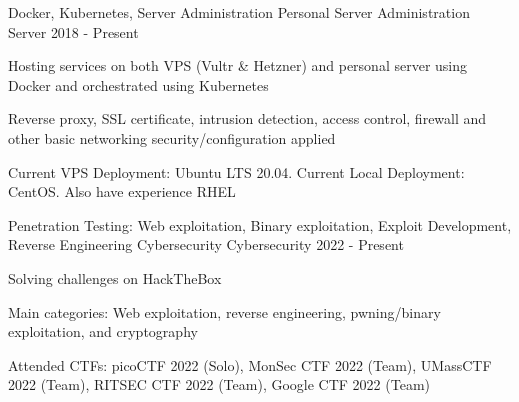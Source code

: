 

\begin{cventries}

  \cventry
    {Docker, Kubernetes, Server Administration}
    {Personal Server Administration}
    {Server}
    {2018 - Present}
    {
      \begin{cvitems}
        \item{Hosting services on both VPS (Vultr \& Hetzner) and personal server using Docker and orchestrated using Kubernetes}
        \item{Reverse proxy, SSL certificate, intrusion detection, access control, firewall and other basic networking security/configuration applied}
        \item{Current VPS Deployment: Ubuntu LTS 20.04. Current Local Deployment: CentOS. Also have experience RHEL}
      \end{cvitems}
    }



  \cventry
    {Penetration Testing: Web exploitation, Binary exploitation, Exploit Development, Reverse Engineering}
    {Cybersecurity}
    {Cybersecurity}
    {2022 - Present}
    {
      \begin{cvitems}
        \item{Solving challenges on HackTheBox}
        \item{Main categories: Web exploitation, reverse engineering, pwning/binary exploitation, and cryptography}
        \item{Attended CTFs: picoCTF 2022 (Solo), MonSec CTF 2022 (Team), UMassCTF 2022 (Team), RITSEC CTF 2022 (Team), Google CTF 2022 (Team)}
      \end{cvitems}
    }

\end{cventries}
